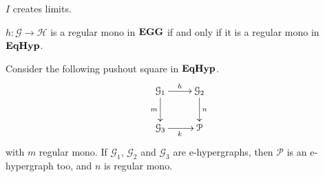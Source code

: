 \begin{corollary}
	$I$ creates limits.
\end{corollary}

\begin{corollary}
	$h: \mathcal{G \to H}$ is a regular mono in $\textbf{\textup{EGG}}$ if and only if it is a regular mono in $\textbf{\textup{EqHyp}}$.
\end{corollary}

\begin{lemma}
	Consider the following pushout square in $\textbf{\textup{EqHyp}}$.
	\[\xymatrix{\mathcal{G}_1 \ar[r]^{h}\ar[d]_{m}&\mathcal{G}_2\ar[d]^{n}\\\mathcal{G}_3\ar[r]_{k}&\mathcal{P}}\]
with $m$ regular mono. If $\mathcal{G}_1$, $\mathcal{G}_2$ and $\mathcal{G}_3$ are e-hypergraphs, then $\mathcal{P}$ is an e-hypergraph too, and $n$ is regular mono.
\end{lemma}

